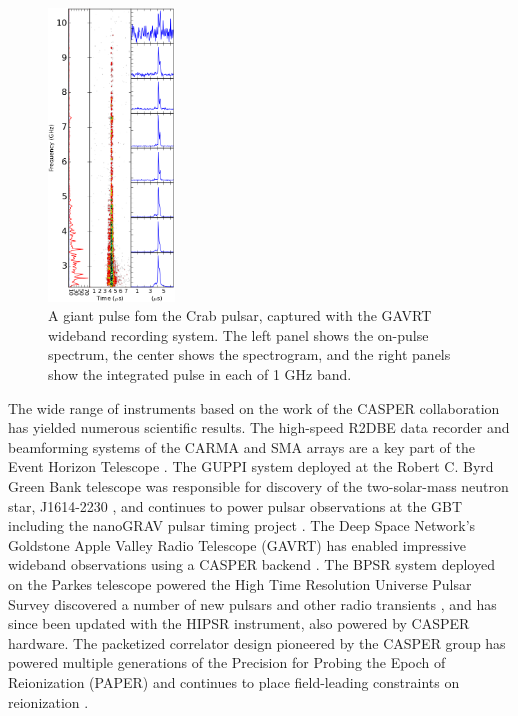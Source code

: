 \documentclass{ws-jai}
\begin{document}
\begin{figure}[ht]
 \centering
 \includegraphics[width=0.3\textwidth]{./figures/pulse_0033_8us_cleaned_up.png}
 \caption{A giant pulse fom the Crab pulsar, captured with the GAVRT wideband recording system. The left panel shows the on-pulse spectrum, the center shows the spectrogram, and the right panels show the integrated pulse in each of 1 GHz band.}
 \label{fig:crab-wide}
\end{figure}

The wide range of instruments based on the work of the CASPER collaboration has yielded numerous scientific results. The high-speed R2DBE data recorder \citep{r2dbe} and beamforming systems of the CARMA and SMA arrays are a key part of the Event Horizon Telescope \citep{eht1, eht2}. The GUPPI system deployed at the Robert C. Byrd Green Bank telescope was responsible for discovery of the two-solar-mass neutron star, J1614-2230 \citep{neutron-star}, and continues to power pulsar observations at the GBT including the nanoGRAV pulsar timing project \citep{nanograv}. The Deep Space Network's Goldstone Apple Valley Radio Telescope (GAVRT) has enabled impressive wideband observations using a CASPER backend \citep[Figure~\ref{fig:crab-wide}]{crab-wide}. The BPSR system deployed on the Parkes telescope powered the High Time Resolution Universe Pulsar Survey discovered a number of new pulsars and other radio transients \citep[for example]{keith2010high, bates2011high, pop-frbs}, and has since been updated with the HIPSR instrument, also powered by CASPER hardware.
The packetized correlator design pioneered by the CASPER group \citep{parsons2008scalable} has powered multiple generations of the Precision for Probing the Epoch of Reionization (PAPER) and continues to place field-leading constraints on reionization \citep{paper64a, paper64b}.
\end{document}
